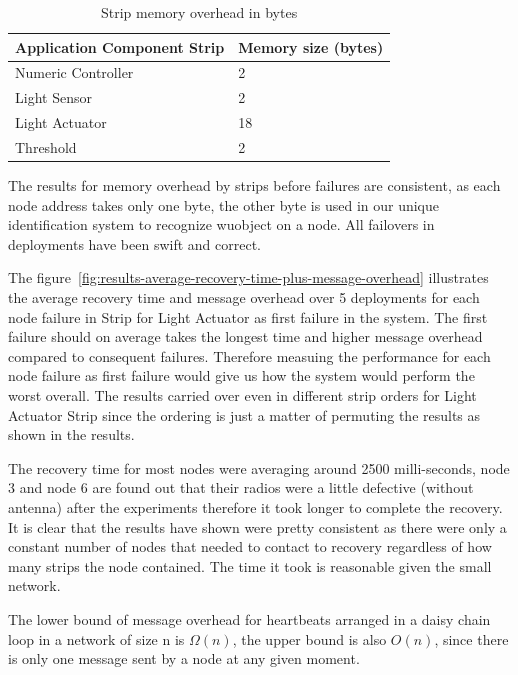 \begin{table}
\centering
\caption{Strip memory overhead in bytes}
\label{tbl:results-memory-overhead-strip}
  \begin{tabular}{|l|l|}
  \hline
  \textbf{Application Component Strip} & \textbf{Memory size (bytes)} \\
  \hline
  Numeric Controller & 2 \\
  \hline
  Light Sensor & 2 \\
  \hline
  Light Actuator & 18 \\
  \hline
  Threshold & 2 \\
  \hline
  \end{tabular}
\end{table}

The results for memory overhead by strips before failures are consistent, as
each node address takes only one byte, the other byte is used in our unique
identification system to recognize wuobject on a node. All failovers in
deployments have been swift and correct.

The figure~\ref{fig:results-average-recovery-time-plus-message-overhead}
illustrates the average recovery time and message overhead over 5 deployments
for each node failure in Strip for Light Actuator as first failure in the
system. The first failure should on average takes the longest time and higher
message overhead compared to consequent failures. Therefore measuing the
performance for each node failure as first failure would give us how the system
would perform the worst overall. The results carried over even in different
strip orders for Light Actuator Strip since the ordering is just a matter of
permuting the results as shown in the results.

The recovery time for most nodes were averaging around 2500 milli-seconds, node
3 and node 6 are found out that their radios were a little defective (without
antenna) after the experiments therefore it took longer to complete the
recovery. It is clear that the results have shown were pretty consistent as
there were only a constant number of nodes that needed to contact to recovery
regardless of how many strips the node contained. The time it took is reasonable
given the small network.

The lower bound of message overhead for heartbeats arranged in a daisy chain
loop in a network of size n is $\Omega(n)$, the upper bound is also $O(n)$, since
there is only one message sent by a node at any given moment.

